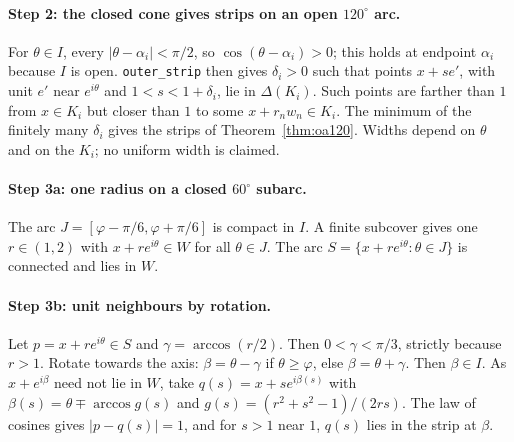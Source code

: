 \documentclass[11pt]{article}
\theoremstyle{definition}
\theoremstyle{remark}
\begin{document}
\paragraph{Step 2: the closed cone gives strips on an open $120^\circ$ arc.}
For $\theta\in I$, every $|\theta-\alpha_i|<\pi/2$, so
$\cos(\theta-\alpha_i)>0$; this holds at endpoint $\alpha_i$ because $I$ is
open. \texttt{outer\_\allowbreak{}strip} then gives $\delta_i>0$ such that points
$x+se'$, with unit $e'$ near $e^{i\theta}$ and $1<s<1+\delta_i$, lie in
$\Delta(K_i)$. Such points are farther than $1$ from $x\in K_i$ but closer
than $1$ to some $x+r_nw_n\in K_i$. The minimum of the finitely many
$\delta_i$ gives the strips of Theorem~\ref{thm:oa120}. Widths depend on
$\theta$ and on the $K_i$; no uniform width is claimed.

\paragraph{Step 3a: one radius on a closed $60^\circ$ subarc.} The arc
$J=[\varphi-\pi/6,\varphi+\pi/6]$ is compact in $I$. A finite subcover
gives one $r\in(1,2)$ with $x+re^{i\theta}\in W$ for all $\theta\in J$. The
arc $S=\{x+re^{i\theta}:\theta\in J\}$ is connected and lies in $W$.

\paragraph{Step 3b: unit neighbours by rotation.} Let $p=x+re^{i\theta}\in S$
and $\gamma=\arccos(r/2)$. Then $0<\gamma<\pi/3$, strictly because $r>1$.
Rotate towards the axis: $\beta=\theta-\gamma$ if $\theta\ge\varphi$, else
$\beta=\theta+\gamma$. Then $\beta\in I$. As $x+e^{i\beta}$ need not lie in
$W$, take $q(s)=x+se^{i\beta(s)}$ with $\beta(s)=\theta\mp\arccos g(s)$ and
$g(s)=(r^2+s^2-1)/(2rs)$. The law of cosines gives $|p-q(s)|=1$, and for
$s>1$ near $1$, $q(s)$ lies in the strip at $\beta$.
\end{document}
